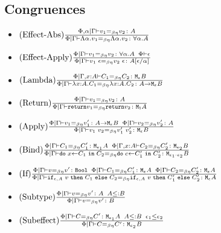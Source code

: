{\subsection{Congruences}
\begin{itemize}
    \item $\treerule{Effect-Abs}{\eberelation{\P, \a}{\G}{v_1}{v_2}{A}}{\gpeberelation{\elam{\a}{v_1}}{\elam{\a}{v_2}}{\all{\a}{A}}}$
    \item $\treerule{Effect-Apply}{\gpeberelation{v_1}{v_2}{\all{\a}{A}}\s\s\wellformed{\P}{\e}}{\gpeberelation{\eapp{v_1}{\e}}{\eapp{v_2}{\e}}{A\ssub{\a}{\e}}}$
    \item $\treerule{Lambda}{\eberelation{\P}{\gax}{C_1}{C_2}{\meb}}{\gpeberelation{\lam{x}{A}{C_1}}{\lam{x}{A}{C_2}}{\aeb}}$
    
    \item $\treerule{Return}{\gpeberelation{v_1}{v_2}{A}}{\gpeberelation{\return{v_1}}{\return{v_2}}{\moa}}$
    
    \item $\treerule{Apply}{\gpeberelation{v_1}{v_1'}{\aeb}\s\s\gpeberelation{v_2}{v_2'}{A}}{\gpeberelation{\apply{v_1}{v_2}}{\apply{v_1'}{v_2'}}{\meb}}$
    
    \item $\treerule{Bind}{\gpeberelation{C_1}{C_1'}{\M{\e_1}{A}} \s\s \eberelation{\P}{\gax}{C_2}{C_2'}{\M{\e_2}{B}}}{\gpeberelation{\doin{x}{C_1}{C_2}}{\doin{c}{C_1'}{C_2'}}{\M{\e_1 \dot \e_2}{B}}}$
    
    \item $\treerule{If}{\gpeberelation{v}{v'}{\B} \s\s \gpeberelation{C_1}{C_1'}{\mea}\s\s\gpeberelation{C_2}{C_2'}{\mea}}{\gpeberelation{\ifthenelse{\e}{A}{v}{C_1}{C_2}}{\ifthenelse{\e}{A}{v}{C_1'}{C_2'}}{\mea}}$
    \item $\treerule{Subtype}{\gpeberelation{v}{v'}{A} \s\s A \subtype B}{\gpeberelation{v}{v'}{B}}$
    \item $\treerule{Subeffect}{\gpeberelation{C}{C'}{\M{\e_1}{A}}\s\s A \subtype B \s\s \e_1 \subeffect \e_2}{\gpeberelation{C}{C'}{\M{\e_2}{B}}}$
\end{itemize}
}

\ifdefined\NoDocument
\else
\documentclass{report}


    \PolymorphicLanguageDefs

\fi
